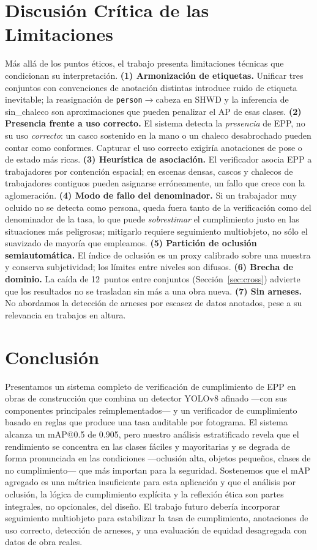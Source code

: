 \documentclass{article}
\begin{document}
\section{Discusión Crítica de las Limitaciones}

Más allá de los puntos éticos, el trabajo presenta limitaciones técnicas que
condicionan su interpretación. \textbf{(1) Armonización de etiquetas.} Unificar
tres conjuntos con convenciones de anotación distintas introduce ruido de
etiqueta inevitable; la reasignación de \texttt{person}$\rightarrow$\textsf{cabeza}
en SHWD y la inferencia de \textsf{sin\_chaleco} son aproximaciones que pueden
penalizar el AP de esas clases. \textbf{(2) Presencia frente a uso correcto.}
El sistema detecta la \emph{presencia} de EPP, no su uso \emph{correcto}: un
casco sostenido en la mano o un chaleco desabrochado pueden contar como
conformes. Capturar el uso correcto exigiría anotaciones de pose o de estado más
ricas. \textbf{(3) Heurística de asociación.} El verificador asocia EPP a
trabajadores por contención espacial; en escenas densas, cascos y chalecos de
trabajadores contiguos pueden asignarse erróneamente, un fallo que crece con la
aglomeración. \textbf{(4) Modo de fallo del denominador.} Si un trabajador muy
ocluido no se detecta como \textsf{persona}, queda fuera tanto de la verificación
como del denominador de la tasa, lo que puede \emph{sobrestimar} el cumplimiento
justo en las situaciones más peligrosas; mitigarlo requiere seguimiento
multiobjeto, no sólo el suavizado de mayoría que empleamos. \textbf{(5)
Partición de oclusión semiautomática.} El índice de oclusión es un proxy
calibrado sobre una muestra y conserva subjetividad; los límites entre niveles
son difusos. \textbf{(6) Brecha de dominio.} La caída de 12~puntos entre
conjuntos (Sección~\ref{sec:cross}) advierte que los resultados no se trasladan
sin más a una obra nueva. \textbf{(7) Sin arneses.} No abordamos la detección de
arneses por escasez de datos anotados, pese a su relevancia en trabajos en
altura.

\section{Conclusión}

Presentamos un sistema completo de verificación de cumplimiento de EPP en obras
de construcción que combina un detector YOLOv8 afinado —con sus componentes
principales reimplementados— y un verificador de cumplimiento basado en reglas
que produce una tasa auditable por fotograma. El sistema alcanza un mAP@0.5 de
0.905, pero nuestro análisis estratificado revela que el rendimiento se concentra
en las clases fáciles y mayoritarias y se degrada de forma pronunciada en las
condiciones —oclusión alta, objetos pequeños, clases de no cumplimiento— que más
importan para la seguridad. Sostenemos que el mAP agregado es una métrica
insuficiente para esta aplicación y que el análisis por oclusión, la lógica de
cumplimiento explícita y la reflexión ética son partes integrales, no opcionales,
del diseño. El trabajo futuro debería incorporar seguimiento multiobjeto para
estabilizar la tasa de cumplimiento, anotaciones de uso correcto, detección de
arneses, y una evaluación de equidad desagregada con datos de obra reales.
\end{document}
